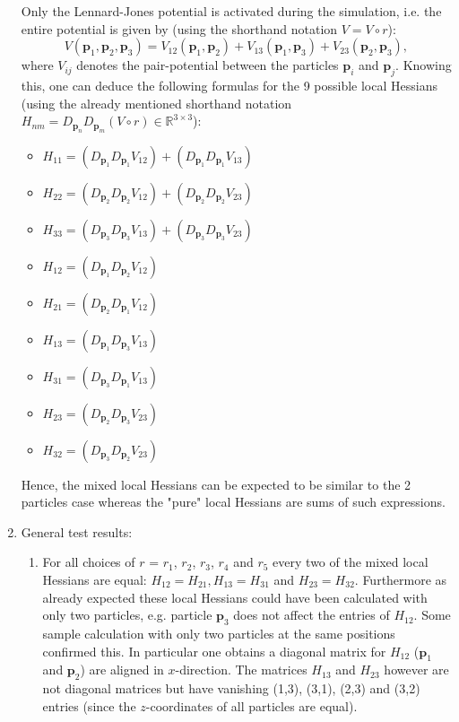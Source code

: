 \documentclass[a4paper]{article}
\newcommand{\boldp}{\boldsymbol{p}}
\newcommand{\reals}{\mathbb{R}}
\begin{document}
\begin{enumerate}
Only the Lennard-Jones potential is activated during the simulation, i.e. the entire potential is given by (using the shorthand notation \(V = V\circ r\)):
\[
V(\boldp_1, \boldp_2, \boldp_3) = V_{12}(\boldp_1, \boldp_2) + V_{13}(\boldp_1, \boldp_3) + V_{23}(\boldp_2, \boldp_3),
\]
where \(V_{ij}\) denotes the pair-potential between the particles \(\boldp_i\) and \(\boldp_j\).
Knowing this, one can deduce the following formulas for the 9 possible local Hessians (using the already mentioned shorthand notation \(H_{nm} = D_{\boldp_n} D_{\boldp_m} (V\circ r) \in \reals^{3\times 3}\)):
\begin{itemize}
\item \(H_{11} = (D_{\boldp_1} D_{\boldp_1} V_{12}) + (D_{\boldp_1} D_{\boldp_1} V_{13})\)
\item \(H_{22} = (D_{\boldp_2} D_{\boldp_2} V_{12}) + (D_{\boldp_2} D_{\boldp_2} V_{23})\)
\item \(H_{33} = (D_{\boldp_3} D_{\boldp_3} V_{13}) + (D_{\boldp_3} D_{\boldp_3} V_{23})\)
\item \(H_{12} = (D_{\boldp_1} D_{\boldp_2} V_{12})\)
\item \(H_{21} = (D_{\boldp_2} D_{\boldp_1} V_{12})\)
\item \(H_{13} = (D_{\boldp_1} D_{\boldp_3} V_{13})\)
\item \(H_{31} = (D_{\boldp_3} D_{\boldp_1} V_{13})\)
\item \(H_{23} = (D_{\boldp_2} D_{\boldp_3} V_{23})\)
\item \(H_{32} = (D_{\boldp_3} D_{\boldp_2} V_{23})\)
\end{itemize}
Hence, the mixed local Hessians can be expected to be similar to the 2 particles case whereas the "pure" local Hessians are sums of such expressions.
\item General test results:
\label{sec-1-5-1-2}
\begin{enumerate}
\item For all choices of \(r\) = \(r_1\), \(r_2\), \(r_3\), \(r_4\) and \(r_5\) every two of the mixed local Hessians are equal: \(H_{12} = H_{21}, H_{13} = H_{31}\) and \(H_{23} = H_{32}\).
Furthermore as already expected these local Hessians could have been calculated with only two particles, e.g. particle \(\boldp_3\) does not affect the entries of \(H_{12}\).
Some sample calculation with only two particles at the same positions confirmed this.
In particular one obtains a diagonal matrix for \(H_{12}\) (\(\boldp_1\) and \(\boldp_2\)) are aligned in \(x\)-direction.
The matrices \(H_{13}\) and \(H_{23}\) however are not diagonal matrices but have vanishing (1,3), (3,1), (2,3) and (3,2) entries (since the \(z\)-coordinates of all particles are equal).

\end{enumerate}
\end{enumerate}
\end{document}
